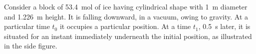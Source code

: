 \documentclass[a4paper,12pt,%
onecolumn,oneside,%
british%
]{memoir}
\renewcommand*{\|}[1][]{\nonscript\:#1\vert\nonscript\:\mathopen{}}
\newcommand*{\yti}{t_{0}}
\newcommand*{\ytf}{t_{1}}
\begin{document}
Consider a block of \qty{53.4}{mol} of ice having cylindrical shape with \qty{1}{m} diameter and \qty{1.226}{m} height. It is falling downward, in a vacuum, owing to gravity. At a particular time $\yti$ it occupies a particular position. At a time $\ytf$, \qty{0.5}{s} later, it is situated for an instant immediately underneath the initial position, as illustrated in the side figure. %
\end{document}
